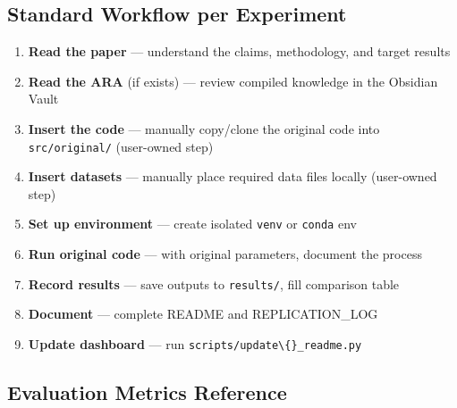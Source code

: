 \subsection{Standard Workflow per
Experiment}\label{standard-workflow-per-experiment}

\begin{enumerate}
\def\labelenumi{\arabic{enumi}.}
\tightlist
\item
  \textbf{Read the paper} --- understand the claims, methodology, and
  target results
\item
  \textbf{Read the ARA} (if exists) --- review compiled knowledge in the
  Obsidian Vault
\item
  \textbf{Insert the code} --- manually copy/clone the original code
  into \texttt{src/original/} (user-owned step)
\item
  \textbf{Insert datasets} --- manually place required data files
  locally (user-owned step)
\item
  \textbf{Set up environment} --- create isolated
  \texttt{venv} or \texttt{conda} env
\item
  \textbf{Run original code} --- with original parameters, document the
  process
\item
  \textbf{Record results} --- save outputs to
  \texttt{results/}, fill comparison table
\item
  \textbf{Document} --- complete README and REPLICATION\_LOG
\item
  \textbf{Update dashboard} --- run
  \texttt{scripts/update\textbackslash\{\}\_readme.py}
\end{enumerate}

\subsection{Evaluation Metrics
Reference}\label{evaluation-metrics-reference}

